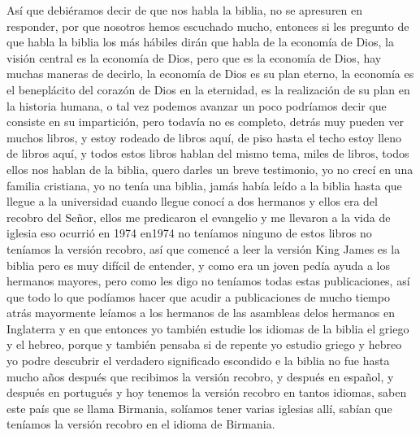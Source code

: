 \documentclass[12pt]{article}
\begin{document}
Así que debiéramos decir de que nos habla la biblia, no se apresuren en responder, por que nosotros hemos escuchado mucho, entonces si les pregunto de que habla la biblia los más hábiles dirán que habla de la economía de Dios, la visión central es la economía de Dios, pero que es la economía de Dios, hay muchas maneras de decirlo, la economía de Dios es su plan eterno, la economía es el beneplácito del corazón de Dios en la eternidad, es la realización de su plan en la historia humana, o tal vez podemos avanzar un poco podríamos decir que consiste en su impartición, pero todavía no es completo, detrás muy pueden ver muchos libros, y estoy rodeado de libros aquí, de piso hasta el techo estoy lleno de libros aquí, y todos estos libros hablan del mismo tema, miles de libros, todos ellos nos hablan de la biblia, quero darles un breve testimonio, yo no crecí en una familia cristiana, yo no tenía una biblia, jamás había leído a la biblia hasta que llegue a la universidad cuando llegue conocí a dos hermanos y ellos era del recobro del Señor, ellos me predicaron el evangelio y me llevaron a la vida de iglesia eso ocurrió en 1974 en1974 no teníamos ninguno de estos libros no teníamos la versión recobro, así que comencé a leer la versión King James es la biblia pero es muy difícil de entender, y como era un joven pedía ayuda a los hermanos mayores, pero como les digo no teníamos todas estas publicaciones, así que todo lo que podíamos hacer que acudir a publicaciones de mucho tiempo atrás mayormente leíamos a los hermanos de las asambleas delos hermanos en Inglaterra y en que entonces yo también estudie los idiomas de la biblia el griego y el hebreo, porque y también pensaba si de repente yo estudio griego y hebreo yo podre descubrir el verdadero significado escondido e la biblia no fue hasta mucho años después que recibimos la versión recobro, y después en español, y después en portugués y hoy tenemos la versión recobro en tantos idiomas, saben este país que se llama Birmania, solíamos tener varias iglesias allí, sabían que teníamos la versión recobro en el idioma de Birmania.\\
\end{document}
